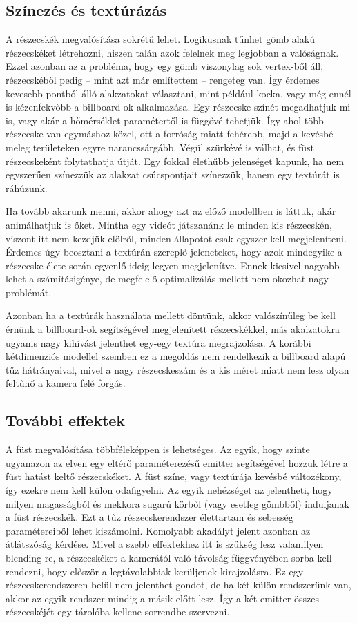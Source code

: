 \subsection{Színezés és textúrázás}
A részecskék megvalósítása sokrétű lehet. Logikusnak tűnhet gömb alakú részecskéket létrehozni, hiszen talán azok felelnek meg legjobban  a valóságnak. Ezzel azonban az a probléma, hogy egy gömb viszonylag sok vertex-ből áll, részecskéből pedig -- mint azt már említettem -- rengeteg van. Így érdemes kevesebb pontból álló alakzatokat választani, mint például kocka, vagy még ennél is kézenfekvőbb a billboard-ok alkalmazása. Egy részecske színét megadhatjuk mi is, vagy akár a hőmérséklet paramétertől is függővé tehetjük. Így ahol több részecske van egymáshoz közel, ott a forróság miatt fehérebb, majd a kevésbé meleg területeken egyre narancssárgább. Végül szürkévé is válhat, és füst részecskeként folytathatja útját. Egy fokkal élethűbb jelenséget kapunk, ha nem egyszerűen színezzük az alakzat csúcspontjait színezzük, hanem egy textúrát is ráhúzunk.

Ha tovább akarunk menni, akkor ahogy azt az előző modellben is láttuk, akár animálhatjuk is őket. Mintha egy videót játszanánk le minden kis részecskén, viszont itt nem kezdjük elölről, minden állapotot csak egyszer kell megjeleníteni. Érdemes úgy beosztani a textúrán szereplő jeleneteket, hogy azok mindegyike a részecske élete során egyenlő ideig legyen megjelenítve. Ennek kicsivel nagyobb lehet a számításigénye, de megfelelő optimalizálás mellett nem okozhat nagy problémát. 

Azonban ha a textúrák használata mellett döntünk, akkor valószínűleg be kell érnünk a billboard-ok segítségével megjelenített részecskékkel, más akalzatokra ugyanis nagy kihívást jelenthet egy-egy textúra megrajzolása. A korábbi kétdimenziós modellel szemben ez a megoldás nem rendelkezik a billboard alapú tűz hátrányaival, mivel a nagy részecskeszám és a kis méret miatt nem lesz olyan feltűnő a kamera felé forgás. 


\subsection{További effektek}
A füst megvalósítása többféleképpen is lehetséges. Az egyik, hogy szinte ugyanazon az elven egy eltérő paraméterezésű emitter segítségével hozzuk létre a füst hatást keltő részecskéket. A füst színe, vagy textúrája kevésbé változékony, így ezekre nem kell külön odafigyelni. Az egyik nehézséget az jelentheti, hogy milyen magasságból és mekkora sugarú körből (vagy esetleg gömbből) induljanak a füst részecskék. Ezt a tűz részecskerendszer élettartam és sebesség paramétereiből lehet kiszámolni. Komolyabb akadályt jelent azonban az átlátszóság kérdése. Mivel a szebb effektekhez itt is szükség lesz valamilyen blending-re, a részecskéket a kamerától való távolság függvényében sorba kell rendezni, hogy először a legtávolabbiak kerüljenek kirajzolásra. Ez egy részecskerendszeren belül nem jelenthet gondot, de ha két külön rendszerünk van, akkor az egyik rendszer mindig a másik előtt lesz. Így a két emitter összes részecskéjét egy tárolóba kellene sorrendbe szervezni.


